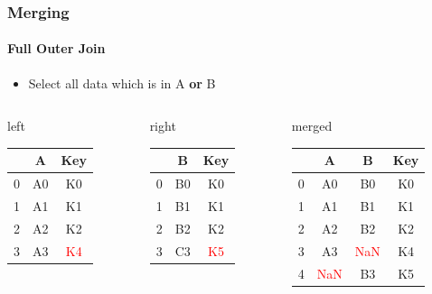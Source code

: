 \documentclass[ngerman]{beamer}
\def\firstcircle{(0,0) circle (2cm)}
\def\secondcircle{(0:3cm) circle (2cm)}
\begin{document}
\begin{frame}
\frametitle{Merging}
\framesubtitle{Full Outer Join}

\begin{itemize}
\item Select all data which is in A \textbf{or} B
\end{itemize}

\begin{center}
\end{center}

{\footnotesize
\begin{columns}
\begin{column}{0.3\textwidth}
left \\
\begin{tabular}{c|cc} \toprule
   & A  &  Key \\ \midrule
0 & A0 &  K0 \\
1 & A1 &  K1 \\ 
2 & A2 &  K2 \\
3 & A3 &  \textcolor{red}{K4} \\ \bottomrule
\end{tabular}
\vspace*{1.2em}
\end{column}
\begin{column}{0.27\textwidth}
right \\
\begin{tabular}{c|cc} \toprule
   &  B   & Key \\ \midrule
0 &  B0 & K0 \\
1 &  B1 & K1 \\ 
2 &  B2 & K2 \\
3 &  C3 & \textcolor{red}{K5} \\ \bottomrule
\end{tabular}
\vspace*{1.2em}
\end{column}
\begin{column}{0.3\textwidth}
merged \\
\begin{tabular}{c|ccc} \toprule
   & A  & B   & Key \\ \midrule
0 & A0 & B0 & K0 \\
1 & A1 & B1 & K1 \\ 
2 & A2 & B2 & K2 \\ 
3 & A3 & \textcolor{red}{NaN} & K4 \\ 
4 & \textcolor{red}{NaN} & B3 & K5 \\ \bottomrule
\end{tabular} \\
\vspace*{0.2em}
\end{column}
\end{columns}}

\end{frame}
\end{document}
